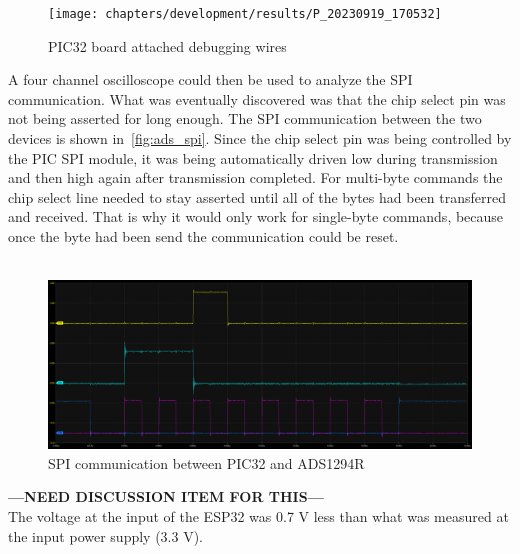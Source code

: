 \begin{figure}[!ht]
  \caption{PIC32 board attached debugging wires}\label{fig:pic_wires}
  \centering
  \texttt{[image: chapters/development/results/P\_20230919\_170532]}
\end{figure}

A four channel oscilloscope could then be used to analyze the SPI communication.
What was eventually discovered was that the chip select pin was not being asserted for long enough.
The SPI communication between the two devices is shown in~\autoref{fig:ads_spi}.
Since the chip select pin was being controlled by the PIC SPI module,
it was being automatically driven low during transmission and then high again after transmission completed.
For multi-byte commands the chip select line needed to stay asserted until all of the bytes had been transferred and received.
That is why it would only work for single-byte commands, because once the byte had been send the communication could be reset.\\\\

\begin{figure}[!ht]
  \caption{SPI communication between PIC32 and ADS1294R}\label{fig:ads_spi}
  \centering
  \includegraphics[width=1\columnwidth]{chapters/development/results/ADS_SPI_COMMS}
\end{figure}

\textbf{---NEED DISCUSSION ITEM FOR THIS---}\\
The voltage at the input of the ESP32 was 0.7 V less than what was measured at the input power supply (3.3 V).
